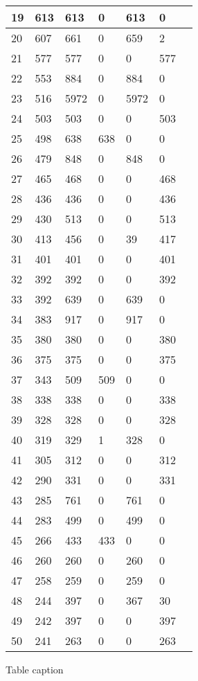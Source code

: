 \begin{longtable}[!ht]{|l|l|l|l|l|l|l|}
19 & 613 & 613 & 0 & 613 & 0 & \cite{pmid12657046} \\ \hline
20 & 607 & 661 & 0 & 659 & 2 & \cite{pmid17704769} \\ \hline
21 & 577 & 577 & 0 & 0 & 577 & \cite{pmid17432890} \\ \hline
22 & 553 & 884 & 0 & 884 & 0 & \cite{pmid11231151} \\ \hline
23 & 516 & 5972 & 0 & 5972 & 0 & \cite{pmid17417969} \\ \hline
24 & 503 & 503 & 0 & 0 & 503 & \cite{pmid14576278} \\ \hline
25 & 498 & 638 & 638 & 0 & 0 & \cite{pmid16429126} \\ \hline
26 & 479 & 848 & 0 & 848 & 0 & \cite{pmid21529718} \\ \hline
27 & 465 & 468 & 0 & 0 & 468 & \cite{pmid11256614} \\ \hline
28 & 436 & 436 & 0 & 0 & 436 & \cite{pmid17644812} \\ \hline
29 & 430 & 513 & 0 & 0 & 513 & \cite{pmid16618929} \\ \hline
30 & 413 & 456 & 0 & 39 & 417 & \cite{pmid18433294} \\ \hline
31 & 401 & 401 & 0 & 0 & 401 & \cite{pmid17151019} \\ \hline
32 & 392 & 392 & 0 & 0 & 392 & \cite{pmid14671022} \\ \hline
33 & 392 & 639 & 0 & 639 & 0 & \cite{pmid12529643} \\ \hline
34 & 383 & 917 & 0 & 917 & 0 & \cite{pmid12445391} \\ \hline
35 & 380 & 380 & 0 & 0 & 380 & \cite{pmid15539469} \\ \hline
36 & 375 & 375 & 0 & 0 & 375 & \cite{pmid12865426} \\ \hline
37 & 343 & 509 & 509 & 0 & 0 & \cite{pmid16189514} \\ \hline
38 & 338 & 338 & 0 & 0 & 338 & \cite{pmid20422638} \\ \hline
39 & 328 & 328 & 0 & 0 & 328 & \cite{pmid12938931} \\ \hline
40 & 319 & 329 & 1 & 328 & 0 & \cite{pmid16336044} \\ \hline
41 & 305 & 312 & 0 & 0 & 312 & \cite{pmid18633119} \\ \hline
42 & 290 & 331 & 0 & 0 & 331 & \cite{pmid11914276} \\ \hline
43 & 285 & 761 & 0 & 761 & 0 & \cite{pmid11099033} \\ \hline
44 & 283 & 499 & 0 & 499 & 0 & \cite{pmid11099034} \\ \hline
45 & 266 & 433 & 433 & 0 & 0 & \cite{pmid11591653} \\ \hline
46 & 260 & 260 & 0 & 260 & 0 & \cite{pmid16502469} \\ \hline
47 & 258 & 259 & 0 & 259 & 0 & \cite{pmid12529438} \\ \hline
48 & 244 & 397 & 0 & 367 & 30 & \cite{pmid17412918} \\ \hline
49 & 242 & 397 & 0 & 0 & 397 & \cite{pmid18981222} \\ \hline
50 & 241 & 263 & 0 & 0 & 263 & \cite{pmid16287169} \\ \hline
\end{longtable}
\label{tab:top50}
\begin{flushleft}Table caption
\end{flushleft}
